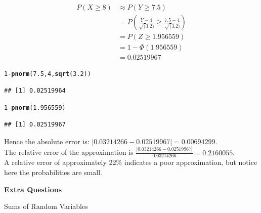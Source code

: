 \documentclass[bigtut]{tutorial}\usepackage[]{graphicx}\usepackage[]{color}
\makeatletter
\newcommand{\hlnum}[1]{\textcolor[rgb]{0.686,0.059,0.569}{#1}}%
\newcommand{\hlopt}[1]{\textcolor[rgb]{0,0,0}{#1}}%
\newcommand{\hlstd}[1]{\textcolor[rgb]{0.345,0.345,0.345}{#1}}%
\newcommand{\hlkwd}[1]{\textcolor[rgb]{0.737,0.353,0.396}{\textbf{#1}}}%
\newenvironment{kframe}{%
 \def\at@end@of@kframe{}%
 \ifinner\ifhmode%
  \def\at@end@of@kframe{\end{minipage}}%
  \begin{minipage}{\columnwidth}%
 \fi\fi%
 \def\FrameCommand##1{\hskip\@totalleftmargin \hskip-\fboxsep
 \colorbox{shadecolor}{##1}\hskip-\fboxsep
     \hskip-\linewidth \hskip-\@totalleftmargin \hskip\columnwidth}%
 \MakeFramed {\advance\hsize-\width
   \@totalleftmargin\z@ \linewidth\hsize
   \@setminipage}}%
 {\par\unskip\endMakeFramed%
 \at@end@of@kframe}
\newenvironment{knitrout}{}{} %
\makeatother
\begin{document}
\begin{tutorial}
\begin{questions}
\begin{solution}
\begin{parts}
\begin{knitrout}
\end{knitrout}

\begin{align*} 
P(X \geq 8) & \approx P(Y \geq 7.5) \\
& = P( \frac {Y - 4}{\sqrt(3.2)} \geq \frac{7.5-4}{\sqrt(3.2)} ) \\
& = P(Z \geq 1.956559 ) \\
& = 1-\Phi(1.956559) \\
& = 0.02519967
\end{align*}

\begin{knitrout}
\color{fgcolor}\begin{kframe}
\begin{alltt}
\hlnum{1}\hlopt{-}\hlkwd{pnorm}\hlstd{(}\hlnum{7.5}\hlstd{,}\hlnum{4}\hlstd{,}\hlkwd{sqrt}\hlstd{(}\hlnum{3.2}\hlstd{))}
\end{alltt}
\begin{verbatim}
## [1] 0.02519964
\end{verbatim}
\begin{alltt}
\hlnum{1}\hlopt{-}\hlkwd{pnorm}\hlstd{(}\hlnum{1.956559}\hlstd{)}
\end{alltt}
\begin{verbatim}
## [1] 0.02519967
\end{verbatim}
\end{kframe}
\end{knitrout}

\vspace{.5cm}
\item
Hence the absolute error is: $|0.03214266 -  0.02519967| = 0.00694299$. \\

The relative error of the approximation is $\frac{|0.03214266 -  0.02519967|}{0.03214266} = 0.2160055$. \\

A relative error of approximately 22\% indicates a poor approximation, but notice here the probabilities are small.
\end{parts}
\end{solution}




\newpage
\vspace{5cm} \hspace{-1cm} {\bf Extra Questions}

\question Sums of Random Variables \\


\end{questions}
\end{tutorial}
\end{document}

